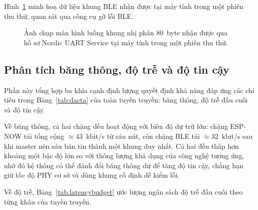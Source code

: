 \documentclass[../DoAn.tex]{subfiles}
\begin{document}
Hình~\ref{fig:blecapture} minh hoạ dữ liệu khung BLE nhận được tại máy tính trong một phiên thu thử, quan sát qua công cụ gỡ lỗi BLE.

\begin{figure}[h]
    \centering
    \caption{Ảnh chụp màn hình luồng khung nhị phân $80$~byte nhận được qua hồ sơ Nordic UART Service tại máy tính trong một phiên thu thử.}
    \label{fig:blecapture}
\end{figure}

\subsection{Phân tích băng thông, độ trễ và độ tin cậy}
\label{subsec:tx_budget}
Phần này tổng hợp ba khía cạnh định lượng quyết định khả năng đáp ứng các chỉ
tiêu trong Bảng~\ref{tab:dacta} của toàn tuyến truyền: băng thông, độ trễ đầu
cuối và độ tin cậy.

Về băng thông, cả hai chặng đều hoạt động với biên độ dự trữ lớn: chặng ESP-NOW
tải tổng cộng $\approx 43$~kbit/s từ sáu nút, còn chặng BLE tải
$\approx 32$~kbit/s sau khi master nén sáu bản tin thành một khung duy nhất. Cả
hai đều thấp hơn khoảng một bậc độ lớn so với thông lượng khả dụng của công nghệ
tương ứng, nhờ đó hệ thống có thể đánh đổi băng thông dư để tăng độ tin cậy,
chẳng hạn giữ tốc độ PHY cơ sở và dùng khung cố định dễ kiểm lỗi.

Về độ trễ, Bảng~\ref{tab:latencybudget} ước lượng ngân sách độ trễ đầu cuối theo
từng khâu của tuyến truyền.
\end{document}
